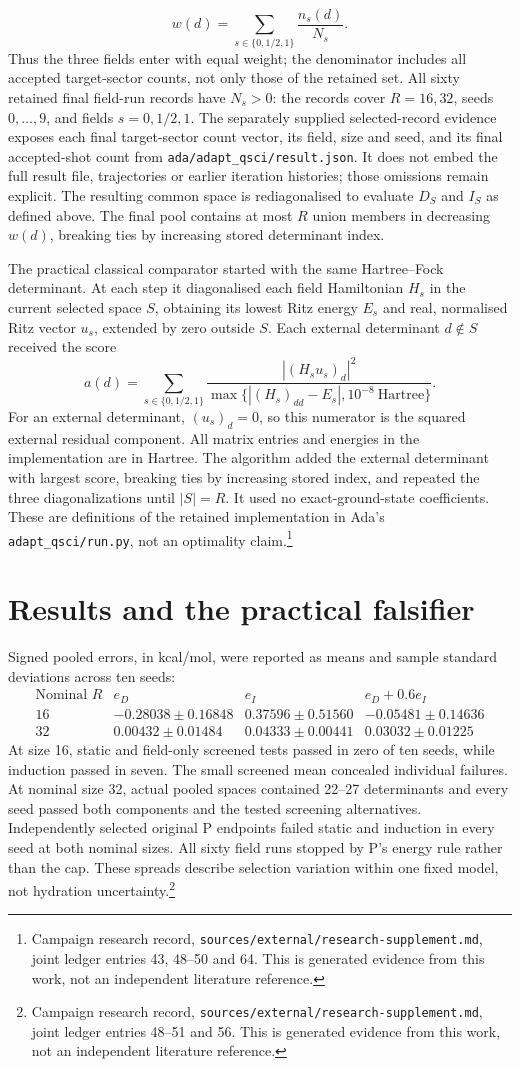 \documentclass{article}
\newcommand{\record}[1]{\footnote{Campaign research record, \texttt{sources/external/research-supplement.md}, #1. This is generated evidence from this work, not an independent literature reference.}}
\begin{document}
\[
 w(d)=\sum_{s\in\{0,1/2,1\}}\frac{n_s(d)}{N_s}.
\]
Thus the three fields enter with equal weight; the denominator includes all accepted target-sector counts, not only those of the retained set. All sixty retained final field-run records have \(N_s>0\): the records cover \(R=16,32\), seeds \(0,\ldots,9\), and fields \(s=0,1/2,1\). The separately supplied selected-record evidence exposes each final target-sector count vector, its field, size and seed, and its final accepted-shot count from \texttt{ada/adapt\_qsci/result.json}. It does not embed the full result file, trajectories or earlier iteration histories; those omissions remain explicit. The resulting common space is rediagonalised to evaluate \(D_S\) and \(I_S\) as defined above. The final pool contains at most \(R\) union members in decreasing \(w(d)\), breaking ties by increasing stored determinant index.

The practical classical comparator started with the same Hartree--Fock determinant. At each step it diagonalised each field Hamiltonian \(H_s\) in the current selected space \(S\), obtaining its lowest Ritz energy \(E_s\) and real, normalised Ritz vector \(u_s\), extended by zero outside \(S\). Each external determinant \(d\notin S\) received the score
\[
 a(d)=\sum_{s\in\{0,1/2,1\}}
 \frac{|(H_su_s)_d|^2}{\max\{|(H_s)_{dd}-E_s|,10^{-8}\ \mathrm{Hartree}\}}.
\]
For an external determinant, \((u_s)_d=0\), so this numerator is the squared external residual component. All matrix entries and energies in the implementation are in Hartree. The algorithm added the external determinant with largest score, breaking ties by increasing stored index, and repeated the three diagonalizations until \(|S|=R\). It used no exact-ground-state coefficients. These are definitions of the retained implementation in Ada's \texttt{adapt\_qsci/run.py}, not an optimality claim.\record{joint ledger entries 43, 48--50 and 64}

\section{Results and the practical falsifier}
Signed pooled errors, in kcal/mol, were reported as means and sample standard deviations across ten seeds:
\[
\begin{array}{c|rrr}
 \text{Nominal }R&e_D&e_I&e_D+0.6e_I\\ \hline
16&-0.28038\pm0.16848&0.37596\pm0.51560&-0.05481\pm0.14636\\
32&0.00432\pm0.01484&0.04333\pm0.00441&0.03032\pm0.01225
\end{array}
\]
At size 16, static and field-only screened tests passed in zero of ten seeds, while induction passed in seven. The small screened mean concealed individual failures. At nominal size 32, actual pooled spaces contained 22--27 determinants and every seed passed both components and the tested screening alternatives. Independently selected original P endpoints failed static and induction in every seed at both nominal sizes. All sixty field runs stopped by P's energy rule rather than the cap. These spreads describe selection variation within one fixed model, not hydration uncertainty.\record{joint ledger entries 48--51 and 56}
\end{document}
